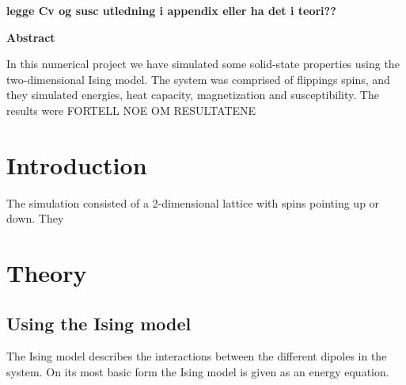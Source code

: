 \documentclass{article}
\begin{document}
\textbf{legge Cv og susc utledning i appendix eller ha det i teori??}


\vspace{1cm}


\begin{center}

{\Large\textbf{Abstract}} \label{sec:Abstract}

\end{center}

In this numerical project we have simulated some solid-state properties using the two-dimensional Ising model. The system was comprised of flippings spins, and they simulated energies, heat capacity, magnetization and susceptibility.
The results were FORTELL NOE OM RESULTATENE

\newpage


\vspace{1cm}

\tableofcontents

\vspace{1cm}

\vspace{1cm}

\section{Introduction} \label{sec:Introduction}

The simulation consisted of a 2-dimensional lattice with spins pointing up or down. They

\vspace{1cm}

\section{Theory} \label{sec:Theory}

\subsection{Using the Ising model}

The Ising model describes the interactions between the different dipoles in the system. On its most basic form the Ising model is given as an energy equation. \\
\end{document}

